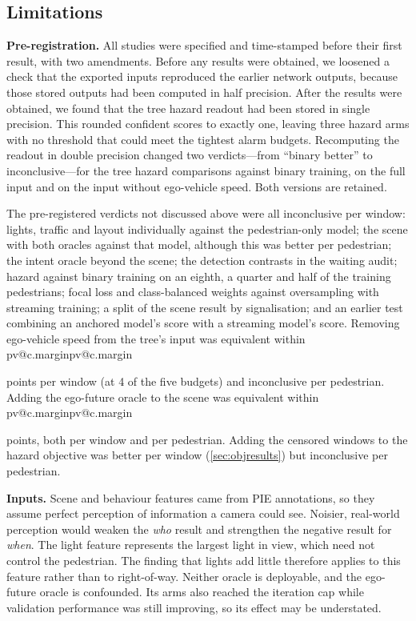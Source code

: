 \documentclass[10pt,a4paper,twocolumn]{article}
\makeatletter
\newcommand{\V}[1]{\ifcsname pv@#1\endcsname\csname pv@#1\endcsname\else
  \PackageError{numbers}{Unknown number key: #1}{Run figures/make_tables.py}\fi}
\makeatother
\begin{document}
\subsection{Limitations}
\label{sec:limitations}
\textbf{Pre-registration.} All studies were specified and time-stamped before
their first result, with two amendments. Before any results were obtained, we
loosened a check that the exported inputs reproduced the earlier network
outputs, because those stored outputs had been computed in half precision.
After the results were obtained, we found that the tree hazard readout had
been stored in single precision. This rounded confident scores to exactly one,
leaving three hazard arms with no threshold that could meet the tightest alarm
budgets. Recomputing the readout in double precision changed two
verdicts---from ``binary better'' to inconclusive---for the tree hazard
comparisons against binary training, on the full input and on the input
without ego-vehicle speed. Both versions are retained.

The pre-registered verdicts not discussed above were all inconclusive per
window: lights, traffic and layout individually against the pedestrian-only
model; the scene with both oracles against that model, although this was
better per pedestrian; the intent oracle beyond the scene; the detection
contrasts in the waiting audit; hazard against binary training on an eighth, a
quarter and half of the training pedestrians; focal loss and class-balanced
weights against oversampling with streaming training; a split of the scene
result by signalisation; and an earlier test combining an anchored model's
score with a streaming model's score. Removing ego-vehicle speed from the
tree's input was equivalent within \V{c.margin} points per window (at 4 of the
five budgets) and inconclusive per pedestrian. Adding the ego-future oracle to
the scene was equivalent within \V{c.margin} points, both per window and per
pedestrian. Adding the censored windows to the hazard objective was better per
window (\cref{sec:objresults}) but inconclusive per pedestrian.

\textbf{Inputs.} Scene and behaviour features came from PIE annotations, so
they assume perfect perception of information a camera could see. Noisier,
real-world perception would weaken the \emph{who} result and strengthen the
negative result for \emph{when}. The light feature represents the largest
light in view, which need not control the pedestrian. The finding that lights
add little therefore applies to this feature rather than to right-of-way.
Neither oracle is deployable, and the ego-future oracle is confounded. Its
arms also reached the iteration cap while validation performance was still
improving, so its effect may be understated.
\end{document}

